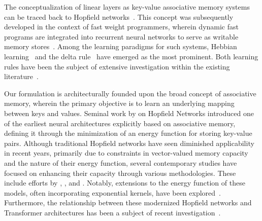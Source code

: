 The conceptualization of linear layers as key-value associative memory systems can be traced back to Hopfield networks~\citep{hopfield1982neural}. This concept was subsequently developed in the context of fast weight programmers, wherein dynamic fast programs are integrated into recurrent neural networks to serve as writable memory stores~\citep{schlag2021linear, schmidhuber1992learning, schmidhuber1993reducing}. Among the learning paradigms for such systems, Hebbian learning~\citep{hebb2005organization} and the delta rule~\citep{prados1989neural} have emerged as the most prominent. Both learning rules have been the subject of extensive investigation within the existing literature~\citep{munkhdalai2017neural, schmidhuber1992learning, munkhdalai2019metalearned, schlag2021linear, irie2021going, yang2024parallelizing, yang2024gated}.





Our formulation is architecturally founded upon the broad concept of associative memory, wherein the primary objective is to learn an underlying mapping between keys and values. Seminal work by \citet{hopfield1982neural} on Hopfield Networks introduced one of the earliest neural architectures explicitly based on associative memory, defining it through the minimization of an energy function for storing key-value pairs. Although traditional Hopfield networks have seen diminished applicability in recent years, primarily due to constraints in vector-valued memory capacity and the nature of their energy function, several contemporary studies have focused on enhancing their capacity through various methodologies. These include efforts by \citet{krotov2021hierarchical}, \citet{li2024expressive}, and \citet{krotov2016dense}. Notably, extensions to the energy function of these models, often incorporating exponential kernels, have been explored~\citep{krotov2016dense, lucibello2024exponential}. Furthermore, the relationship between these modernized Hopfield networks and Transformer architectures has been a subject of recent investigation~\citep{ramsauer2021hopfield, hu2024provably}.










